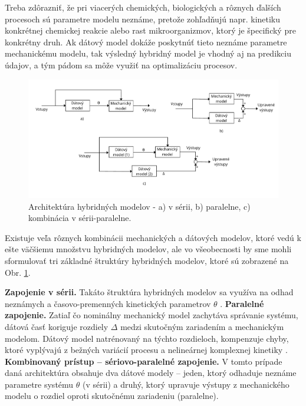 Treba zdôrazniť, že pri viacerých chemických, biologických a rôznych ďalších procesoch sú parametre modelu neznáme, pretože zohľadňujú napr. kinetiku konkrétnej chemickej reakcie alebo rast mikroorganizmov, ktorý je špecifický pre konkrétny druh. Ak dátový model dokáže poskytnúť tieto neznáme parametre mechanickému modelu, tak výsledný hybridný model je vhodný aj na predikciu údajov, a tým pádom sa môže využiť na optimalizáciu procesov.

\begin{figure}
	\centering
	\includegraphics[width=\linewidth]{images/hybrid_model}
	\caption{Architektúra hybridných modelov - a) v sérii, b) paralelne, c) kombinácia v sérii-paralelne.}
	\label{fig:hybrid_model_general}
\end{figure} 

Existuje veľa rôznych kombinácii mechanických a dátových modelov, ktoré vedú k ešte väčšiemu množstvu hybridných modelov, ale vo všeobecnosti by sme mohli sformulovať tri základné štruktúry hybridných modelov, ktoré sú zobrazené na Obr. \ref{fig:hybrid_model_general}.

\textbf{Zapojenie v sérii.} Takáto štruktúra hybridných modelov sa využíva na odhad neznámych  a časovo-premenných kinetických parametrov $ \theta $ \cite{bhutani:hybrid_modelling_opt:2006}.\newline
\textbf{Paralelné zapojenie.} Zatiaľ čo nominálny mechanický model zachytáva správanie systému, dátová časť koriguje rozdiely $ \Delta $ medzi skutočným zariadením a mechanickým modelom. Dátový model natrénovaný na týchto rozdieloch, kompenzuje chyby, ktoré vyplývajú z bežných variácií procesu a nelineárnej komplexnej kinetiky \cite{bhutani:hybrid_modelling_opt:2006}.\newline
\textbf{Kombinovaný prístup -- sériovo-paralelné zapojenie.} V tomto prípade daná architektúra obsahuje dva dátové modely -- jeden, ktorý odhaduje neznáme parametre systému $ \theta $ (v sérii) a druhý, ktorý upravuje výstupy z mechanického modelu o rozdiel oproti skutočnému zariadeniu (paralelne). 
